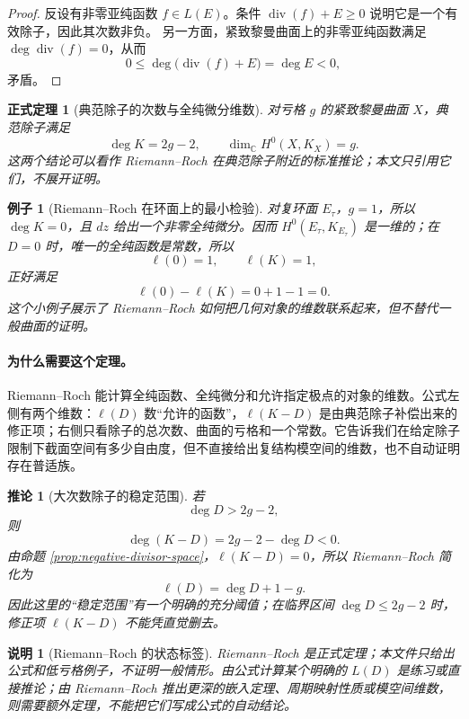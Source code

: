 \documentclass[UTF8,fontset=none,a4paper,11pt]{ctexart}
\theoremstyle{foundation-definition}
\theoremstyle{foundation-theorem}
\newtheorem{theorem}[definition]{正式定理}
\theoremstyle{foundation-proposition}
\theoremstyle{foundation-example}
\newtheorem{example}[definition]{例子}
\theoremstyle{foundation-remark}
\newtheorem{remark}[definition]{说明}
\theoremstyle{foundation-theorem}
\newtheorem{corollary}[definition]{推论}
\begin{document}
\begin{proof}
反设有非零亚纯函数 \(f\in L(E)\)。条件
\(\operatorname{div}(f)+E\geq0\) 说明它是一个有效除子，因此其次数非负。
另一方面，紧致黎曼曲面上的非零亚纯函数满足
\(\deg\operatorname{div}(f)=0\)，从而
\[
0\leq\deg\bigl(\operatorname{div}(f)+E\bigr)=\deg E<0,
\]
矛盾。
\end{proof}

\begin{theorem}[典范除子的次数与全纯微分维数]\label{thm:canonical-divisor-degree}
对亏格 \(g\) 的紧致黎曼曲面 \(X\)，典范除子满足
\[
\deg K=2g-2,
\qquad
\dim_{\mathbb C}H^0(X,K_X)=g.
\]
这两个结论可以看作 Riemann--Roch 在典范除子附近的标准推论；本文只引用它们，不展开证明。
\end{theorem}

\begin{example}[Riemann--Roch 在环面上的最小检验]
对复环面 \(E_\tau\)，\(g=1\)，所以 \(\deg K=0\)，且 \(dz\) 给出一个非零全纯微分。因而 \(H^0(E_\tau,K_{E_\tau})\) 是一维的；在 \(D=0\) 时，唯一的全纯函数是常数，所以
\[
\ell(0)=1,\qquad
\ell(K)=1,
\]
正好满足
\[
\ell(0)-\ell(K)=0+1-1=0.
\]
这个小例子展示了 Riemann--Roch 如何把几何对象的维数联系起来，但不替代一般曲面的证明。
\end{example}

\paragraph{为什么需要这个定理。}
Riemann--Roch 能计算全纯函数、全纯微分和允许指定极点的对象的维数。公式左侧有两个维数：\(\ell(D)\) 数“允许的函数”，\(\ell(K-D)\) 是由典范除子补偿出来的修正项；右侧只看除子的总次数、曲面的亏格和一个常数。它告诉我们在给定除子限制下截面空间有多少自由度，但不直接给出复结构模空间的维数，也不自动证明存在普适族。

\begin{corollary}[大次数除子的稳定范围]
若
\[
\deg D>2g-2,
\]
则
\[
\deg(K-D)=2g-2-\deg D<0.
\]
由命题 \ref{prop:negative-divisor-space}，\(\ell(K-D)=0\)，所以 Riemann--Roch
简化为
\[
\ell(D)=\deg D+1-g.
\]
因此这里的“稳定范围”有一个明确的充分阈值；在临界区间
\(\deg D\leq2g-2\) 时，修正项 \(\ell(K-D)\) 不能凭直觉删去。
\end{corollary}

\begin{remark}[Riemann--Roch 的状态标签]
Riemann--Roch 是正式定理；本文件只给出公式和低亏格例子，不证明一般情形。由公式计算某个明确的 \(L(D)\) 是练习或直接推论；由 Riemann--Roch 推出更深的嵌入定理、周期映射性质或模空间维数，则需要额外定理，不能把它们写成公式的自动结论。
\end{remark}
\end{document}
